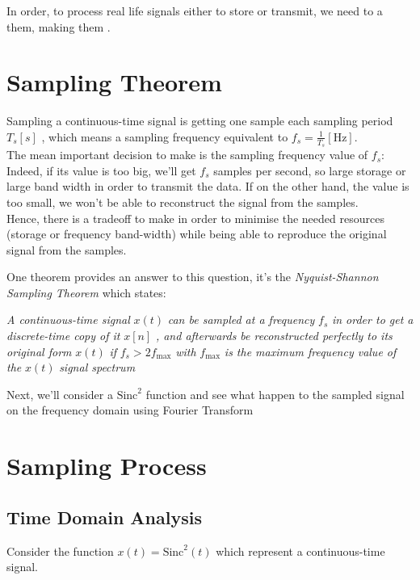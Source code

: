 \documentclass{report}
\begin{document}
In order, to process real life signals either to store or transmit, we need to a  them, making them . 

\section*{Sampling Theorem}

Sampling a continuous-time signal is getting one sample each sampling period \(T_s[s]\) , which means a sampling frequency equivalent to \(f_s=\frac{1}{T_s}[\text{Hz}]\).\\
The mean important decision to make is the sampling frequency value of \(f_s\): Indeed, if its value is too big, we{'}ll get \(f_s\) samples per
second, so large storage or large band width in order to transmit the data. If on the other hand, the value is too small, we won{'}t be able to reconstruct
the signal from the samples.\\
Hence, there is a tradeoff to make in order to minimise the needed resources (storage or frequency band-width) while being able to reproduce the
original signal from the samples.

One theorem provides an answer to this question, it{'}s the \textit{ Nyquist-Shannon Sampling Theorem} which states:

\textit{ A continuous-time signal }\textit{ \(x(t)\)}\textit{  can be sampled at a frequency }\textit{ \(f_s\)}\textit{  in order to get a discrete-time
copy of it }\textit{ \(x[n]\)}\textit{ , and afterwards be reconstructed perfectly to its original form }\textit{ \(x(t)\)}\textit{ if }\textit{
\(f_s>2f_{\max }\)}\textit{  with }\textit{ \(f_{\max }\)}\textit{  is the maximum frequency value of the }\textit{ \(x(t)\)}\textit{  signal spectrum}

Next, we{'}ll consider a \(\text{Sinc}^2\) function and see what happen to the sampled signal on the frequency domain using Fourier Transform

\section*{Sampling Process}

\subsection*{Time Domain Analysis}

Consider the function \(x(t)=\text{Sinc}^2(t)\) which represent a continuous-time signal.
\end{document}
